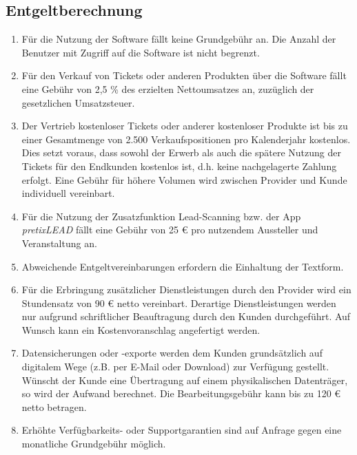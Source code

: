 \documentclass{terms}
\begin{document}
\subsection{Entgeltberechnung}
\label{entgelt}
\begin{enumerate}
\item Für die Nutzung der Software fällt keine Grundgebühr an. Die Anzahl der Benutzer mit Zugriff auf die Software ist nicht begrenzt.
\item Für den Verkauf von Tickets oder anderen Produkten über die Software fällt eine Gebühr von 2,5 \% des erzielten Nettoumsatzes an, zuzüglich der gesetzlichen Umsatzsteuer.
\item Der Vertrieb kostenloser Tickets oder anderer kostenloser Produkte ist bis zu einer Gesamtmenge von 2.500 Verkaufspositionen pro Kalenderjahr kostenlos. Dies setzt voraus, dass sowohl der Erwerb als auch die spätere Nutzung der Tickets für den Endkunden kostenlos ist, d.h. keine nachgelagerte Zahlung erfolgt. Eine Gebühr für höhere Volumen wird zwischen Provider und Kunde individuell vereinbart.
\item Für die Nutzung der Zusatzfunktion Lead-Scanning bzw. der App \emph{pretixLEAD} fällt eine Gebühr von 25 € pro nutzendem Aussteller und Veranstaltung an.
\item Abweichende Entgeltvereinbarungen erfordern die Einhaltung der Textform.
\item Für die Erbringung zusätzlicher Dienstleistungen durch den Provider wird ein Stundensatz von 90 € netto vereinbart. Derartige Dienstleistungen werden nur aufgrund schriftlicher Beauftragung durch den Kunden durchgeführt. Auf Wunsch kann ein Kostenvoranschlag angefertigt werden.
\item Datensicherungen oder -exporte werden dem Kunden grundsätzlich auf digitalem Wege (z.B. per E-Mail oder Download) zur Verfügung gestellt. Wünscht der Kunde eine Übertragung auf einem physikalischen Datenträger, so wird der Aufwand berechnet. Die Bearbeitungsgebühr kann bis zu 120 € netto betragen.
\item Erhöhte Verfügbarkeits- oder Supportgarantien sind auf Anfrage gegen eine monatliche Grundgebühr möglich.
\end{enumerate}
\end{document}

